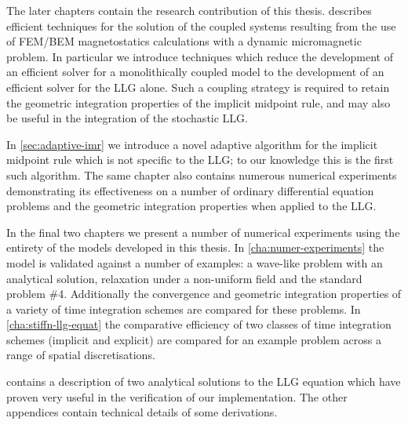 The later chapters contain the research contribution of this thesis.
 describes efficient techniques for the solution of the coupled systems resulting from the use of FEM/BEM magnetostatics calculations with a dynamic micromagnetic problem.
In particular we introduce techniques which reduce the development of an efficient solver for a monolithically coupled model to the development of an efficient solver for the LLG alone.
Such a coupling strategy is required to retain the geometric integration properties of the implicit midpoint rule, and may also be useful in the integration of the stochastic LLG.

In \cref{sec:adaptive-imr} we introduce a novel adaptive algorithm for the implicit midpoint rule which is not specific to the LLG; to our knowledge this is the first such algorithm.
The same chapter also contains numerous numerical experiments demonstrating its effectiveness on a number of ordinary differential equation problems and the geometric integration properties when applied to the LLG.

In the final two chapters we present a number of numerical experiments using the entirety of the models developed in this thesis.
In \cref{cha:numer-experiments} the model is validated against a number of examples: a wave-like problem with an analytical solution, relaxation under a non-uniform field and the \mumag standard problem \#4.
Additionally the convergence and geometric integration properties of a variety of time integration schemes are compared for these problems.
In \cref{cha:stiffn-llg-equat} the comparative efficiency of two classes of time integration schemes (implicit and explicit) are compared for an example problem across a range of spatial discretisations.

 contains a description of two analytical solutions to the LLG equation which have proven very useful in the verification of our implementation.
The other appendices contain technical details of some derivations.


